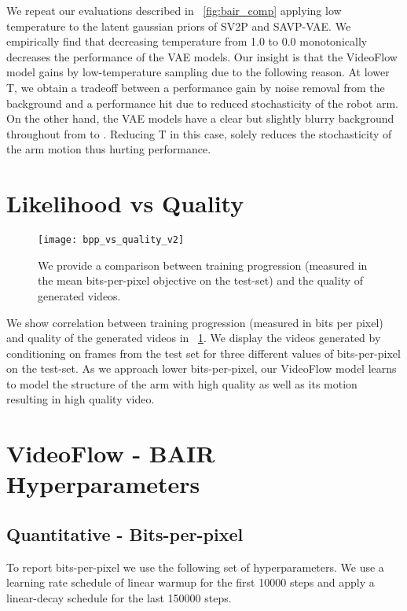 \documentclass{article} \usepackage{iclr2020_conference,times}
\newcommand{\figref}[1]{\figurename~\ref{#1}}
\begin{document}
We repeat our evaluations described in \figref{fig:bair_comp} applying low temperature to the latent gaussian priors of SV2P and SAVP-VAE. We empirically find that decreasing temperature from 1.0 to 0.0 monotonically decreases the performance of the VAE models. Our insight is that the VideoFlow model gains by low-temperature sampling due to the following reason. At lower T, we obtain a tradeoff between a performance gain by noise removal from the background and a performance hit due to reduced stochasticity of the robot arm. On the other hand, the VAE models have a clear but slightly blurry background throughout from  to . Reducing T in this case, solely reduces the stochasticity of the arm motion thus hurting performance.

\section{Likelihood vs Quality}

\begin{figure}[h]
\centering
\texttt{[image: bpp\_vs\_quality\_v2]}
\caption{We provide a comparison between training progression (measured in the mean bits-per-pixel objective on the test-set) and the quality of generated videos.}
\label{bpp_vs_quality}
\end{figure}

We show correlation between training progression (measured in bits per pixel) and quality of the generated videos in \figref{bpp_vs_quality}. We display the videos generated by conditioning on frames from the test set for three different values of bits-per-pixel on the test-set. As we approach lower bits-per-pixel, our VideoFlow model learns to model the structure of the arm with high quality as well as its motion resulting in high quality video.





\section{VideoFlow - BAIR Hyperparameters}

\subsection{Quantitative - Bits-per-pixel}

To report bits-per-pixel we use the following set of hyperparameters. We use a learning rate schedule of linear warmup for the first 10000 steps and apply a linear-decay schedule for the last 150000 steps.
\end{document}
